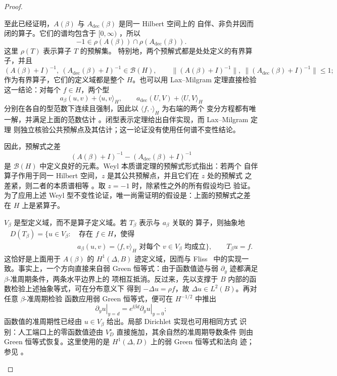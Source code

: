 \begin{proof}
\begin{enumerate}[label=\textit{步骤 \arabic*.},leftmargin=*]
至此已经证明，$A(\beta)$ 与 $A_{\mathrm{dec}}(\beta)$ 是同一 Hilbert 空间上的
自伴、非负并因而闭的算子。它们的谱均包含于 $[0,\infty)$
\cite[Chapter~V]{Kato1995}，所以
\[
  -1\in\rho(A(\beta))\cap\rho(A_{\mathrm{dec}}(\beta)).
\]
这里 $\rho(T)$ 表示算子 $T$ 的预解集。
特别地，两个预解式都是处处定义的有界算子，并且
\[
  (A(\beta)+I)^{-1},\ (A_{\mathrm{dec}}(\beta)+I)^{-1}
  \in\mathcal B(H),
  \qquad
  \|(A(\beta)+I)^{-1}\|,\
  \|(A_{\mathrm{dec}}(\beta)+I)^{-1}\|\leq1;
\]
作为有界算子，它们的定义域都是整个 $H$。也可以用 Lax--Milgram 定理直接检验
这一结论：对每个 $f\in H$，两个型
\[
  a_\beta(u,v)+\langle u,v\rangle_H,
  \qquad
  a_{\mathrm{dec}}(U,V)+\langle U,V\rangle_H
\]
分别在各自的型范数下连续且强制，因此以 $\langle f,\cdot\rangle_H$ 为右端的两个
变分方程都有唯一解，并满足上面的范数估计
\cite[Lemma~2.32]{McLean2000}。闭型表示定理给出自伴实现，而 Lax--Milgram 定理
则独立核验公共预解点及其估计；这一论证没有使用任何谱不变性结论。

因此，预解式之差
\[
  (A(\beta)+I)^{-1}-(A_{\mathrm{dec}}(\beta)+I)^{-1}
\]
是 $\mathcal B(H)$ 中定义良好的元素。Weyl 本质谱定理的预解式形式指出：若两个
自伴算子作用于同一 Hilbert 空间，$z$ 是其公共预解点，并且它们在 $z$ 处的预解式
之差紧，则二者的本质谱相等
\cite[Theorem~XIII.14]{ReedSimon1978}。取 $z=-1$ 时，除紧性之外的所有假设均已
验证。为了应用上述 Weyl 型不变性论证，唯一尚需证明的假设是：上面的预解式之差
在 $H$ 上是紧算子。
\end{enumerate}

\begin{proofremark}[型定义域与算子定义域]
$V_\beta$ 是型定义域，而不是算子定义域。若 $T_\beta$ 表示与 $a_\beta$ 关联的
算子，则抽象地
\[
\begin{aligned}
  D(T_\beta)=\bigl\{u\in V_\beta:{}&\ \text{存在 }f\in H\text{，使得}\\[-1mm]
  &a_\beta(u,v)=\langle f,v\rangle_H
  \text{ 对每个 }v\in V_\beta\text{ 均成立}\bigr\},
  \qquad T_\beta u=f.
\end{aligned}
\]
这恰好是上面用于 $A(\beta)$ 的 $H^1(\Delta,B)$ 迹定义域，因而与
Fliss~\cite[Section~3]{Fliss2013} 中的实现一致。事实上，一个方向直接来自弱 Green
恒等式：由于函数值迹与弱 $\partial_y$ 迹都满足 $\beta$-准周期条件，两条水平边界上的
项相互抵消。反过来，先以支撑于 $B$ 内部的函数检验上述抽象等式，可在分布意义下
得到 $-\Delta u=\rho f$，故 $\Delta u\in L^2(B)$。再对任意 $\beta$-准周期检验
函数应用弱 Green 恒等式，便可在 $H^{-1/2}$ 中推出
\[
  \left.\partial_yu\right|_{y=d}
  =e^{\ii\beta d}\left.\partial_yu\right|_{y=0};
\]
函数值的准周期性已经由 $u\in V_\beta$ 给出。局部 Dirichlet 实现也可用相同方式
识别：人工端口上的零函数值迹由 $V_D^\star$ 直接施加，其余自然的准周期导数条件
则由 Green 恒等式恢复。这里使用的是 $H^1(\Delta,D)$ 上的弱 Green 恒等式和法向
迹；参见 \cite[Chapters~3--4]{McLean2000}。
\end{proofremark}


\end{proof}
